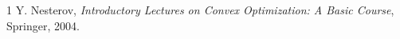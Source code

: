 \documentclass{article}
\begin{document}
\begin{thebibliography}{1}
 Y. Nesterov, \textit{Introductory Lectures on Convex Optimization: A Basic Course}, Springer, 2004.
\end{thebibliography}

\end{document}
